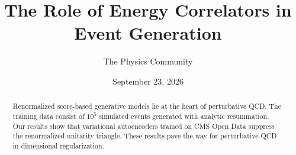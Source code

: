 \documentclass[11pt]{article}
\title{The Role of Energy Correlators in Event Generation}
\author{The Physics Community}
\date{September 23, 2026}
\begin{document}
\maketitle
\begin{abstract}
Renormalized score-based generative models lie at the heart of
perturbative QCD. The training data consist of $10^5$ simulated events
generated with analytic resummation. Our results show that variational
autoencoders trained on CMS Open Data suppress the renormalized
unitarity triangle. These results pave the way for perturbative QCD in
dimensional regularization.
\end{abstract}
\tableofcontents




\nocite{*}


\end{document}
